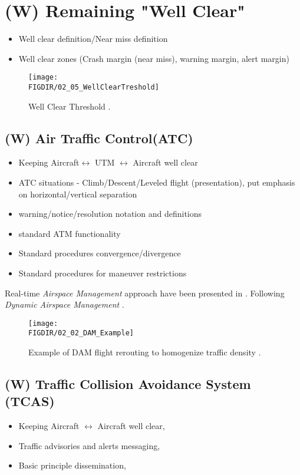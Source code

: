 \section{(W) Remaining "Well Clear"}\label{sec:WellClear}
    \begin{itemize}
        \item Well clear definition/Near miss definition
        \item Well clear zones (Crash margin (near miss), warning margin, alert margin)
    \end{itemize}
    \begin{figure}[H]
        \centering
        \texttt{[image: \\FIGDIR/02\_05\_WellClearTreshold]}
        \caption{Well Clear Threshold \cite{valavanis2015uav,united1983pilots}.}
        \label{fig:WellClearTreshold}
    \end{figure}


\subsection{(W) Air Traffic Control(ATC)}\label{sec:AirTrafficControl}
    \begin{itemize}
        \item Keeping Aircraft$\leftrightarrow$ UTM $\leftrightarrow$ Aircraft well clear
        \item ATC situations - Climb/Descent/Leveled flight (presentation), put emphasis on horizontal/vertical separation
        \item warning/notice/resolution notation and definitions
        \item standard ATM functionality
        \item Standard procedures convergence/divergence
        \item Standard procedures for maneuver restrictions
    \end{itemize}
    
    Real-time \emph{Airspace Management} approach have been presented in \cite{gardi2014real}. Following \emph{Dynamic Airspace Management} \cite{gerdes2016dynamic}.
    \begin{figure}[H]
        \centering
        \texttt{[image: \\FIGDIR/02\_02\_DAM\_Example]}
        \caption{Example of DAM flight rerouting to homogenize traffic density \cite{gerdes2016dynamic}.}
        \label{fig:DAMExample}
    \end{figure}


\subsection{(W) Traffic Collision Avoidance System (TCAS)}\label{sec:TCAS}
\begin{itemize}
    \item Keeping Aircraft $\leftrightarrow$ Aircraft well clear,
    \item Traffic advisories and alerts messaging,
    \item Basic principle dissemination,
\end{itemize}

